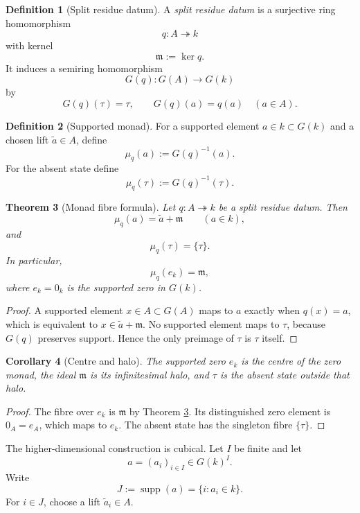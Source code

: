 \documentclass[11pt]{amsart}
\numberwithin{equation}{section}
\newtheorem{theorem}{Theorem}[section]
\newtheorem{corollary}[theorem]{Corollary}
\theoremstyle{definition}
\newtheorem{definition}[theorem]{Definition}
\newcommand{\supp}{\operatorname{supp}}
\begin{document}
\begin{definition}[Split residue datum]\label{def:split-residue-datum}
A \emph{split residue datum} is a surjective ring homomorphism
\[
q:A\twoheadrightarrow k
\]
with kernel
\[
\mathfrak m:=\ker q.
\]
It induces a semiring homomorphism
\[
G(q):G(A)\longrightarrow G(k)
\]
by
\[
G(q)(\tau)=\tau,
\qquad
G(q)(a)=q(a)
\quad(a\in A).
\]
\end{definition}

\begin{definition}[Supported monad]
For a supported element $a\in k\subset G(k)$ and a chosen lift $\widetilde a\in A$, define
\[
\mu_q(a):=G(q)^{-1}(a).
\]
For the absent state define
\[
\mu_q(\tau):=G(q)^{-1}(\tau).
\]
\end{definition}

\begin{theorem}[Monad fibre formula]\label{thm:monad-fibre}
Let $q:A\twoheadrightarrow k$ be a split residue datum.  Then
\[
\mu_q(a)=\widetilde a+\mathfrak m
\qquad(a\in k),
\]
and
\[
\mu_q(\tau)=\{\tau\}.
\]
In particular,
\[
\mu_q(e_k)=\mathfrak m,
\]
where $e_k=0_k$ is the supported zero in $G(k)$.
\end{theorem}

\begin{proof}
A supported element $x\in A\subset G(A)$ maps to $a$ exactly when $q(x)=a$, which is equivalent to $x\in\widetilde a+\mathfrak m$.  No supported element maps to $\tau$, because $G(q)$ preserves support.  Hence the only preimage of $\tau$ is $\tau$ itself.
\end{proof}

\begin{corollary}[Centre and halo]\label{cor:centre-and-halo}
The supported zero $e_k$ is the centre of the zero monad, the ideal $\mathfrak m$ is its infinitesimal halo, and $\tau$ is the absent state outside that halo.
\end{corollary}

\begin{proof}
The fibre over $e_k$ is $\mathfrak m$ by Theorem \ref{thm:monad-fibre}.  Its distinguished zero element is $0_A=e_A$, which maps to $e_k$.  The absent state has the singleton fibre $\{\tau\}$.
\end{proof}

The higher-dimensional construction is cubical.  Let $I$ be finite and let
\[
a=(a_i)_{i\in I}\in G(k)^I.
\]
Write
\[
J:=\supp(a)=\{i:a_i\in k\}.
\]
For $i\in J$, choose a lift $\widetilde a_i\in A$.
\end{document}
